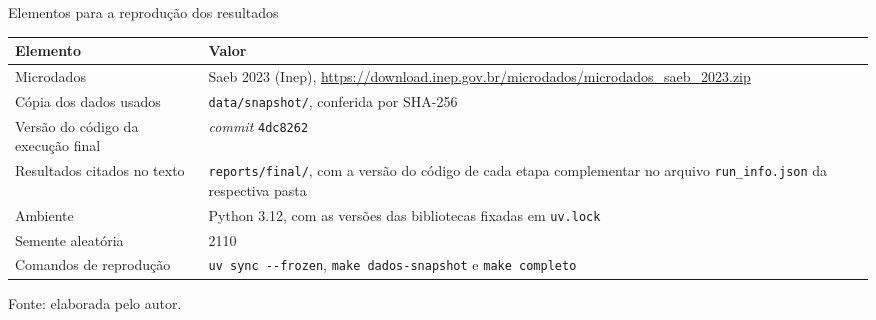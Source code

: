 \begin{quadro}[H]
    \centering
    \footnotesize
    \caption{Elementos para a reprodução dos resultados}
    \begin{tabular}{|L{4.2cm}|L{10.0cm}|}
        \hline
        \textbf{Elemento} & \textbf{Valor} \\
        \hline
        Microdados & Saeb 2023 (Inep), \url{https://download.inep.gov.br/microdados/microdados_saeb_2023.zip} \\ \hline
        Cópia dos dados usados & \texttt{data/snapshot/}, conferida por SHA-256 \\ \hline
        Versão do código da execução final & \textit{commit} \texttt{4dc8262} \\ \hline
        Resultados citados no texto & \texttt{reports/final/}, com a versão do código de cada etapa complementar no arquivo \texttt{run\_info.json} da respectiva pasta \\ \hline
        Ambiente & Python 3.12, com as versões das bibliotecas fixadas em \texttt{uv.lock} \\ \hline
        Semente aleatória & 2110 \\ \hline
        Comandos de reprodução & \texttt{uv sync -{}-frozen}, \texttt{make dados-snapshot} e \texttt{make completo} \\
        \hline
    \end{tabular}
    \vspace{0.1cm}
    \begin{flushleft}
    {\footnotesize Fonte: elaborada pelo autor.}
    \end{flushleft}
    \label{quad:reproducao}
\end{quadro}


